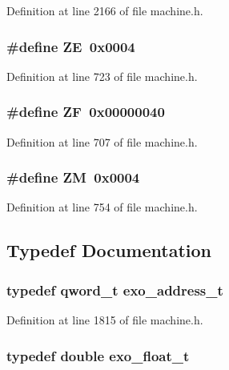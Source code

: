Definition at line 2166 of file machine.h.
\subsubsection[{ZE}]{\setlength{\rightskip}{0pt plus 5cm}\#define ZE~0x0004}\label{machine_8h_25bc8ca4e2e0de788210187701b4cbeb}




Definition at line 723 of file machine.h.
\subsubsection[{ZF}]{\setlength{\rightskip}{0pt plus 5cm}\#define ZF~0x00000040}\label{machine_8h_b4dfddb53d3b02a91b6a0429bdc10143}




Definition at line 707 of file machine.h.
\subsubsection[{ZM}]{\setlength{\rightskip}{0pt plus 5cm}\#define ZM~0x0004}\label{machine_8h_8cba89c77d3e5469a5a585e546717ebe}




Definition at line 754 of file machine.h.

\subsection{Typedef Documentation}
\subsubsection[{exo\_\-address\_\-t}]{\setlength{\rightskip}{0pt plus 5cm}typedef qword\_\-t {\bf exo\_\-address\_\-t}}\label{machine_8h_6ebeb858f9326a0ab31f2dbd07fdc797}




Definition at line 1815 of file machine.h.
\subsubsection[{exo\_\-float\_\-t}]{\setlength{\rightskip}{0pt plus 5cm}typedef double {\bf exo\_\-float\_\-t}}\label{machine_8h_1e0eec611b1473a5d69539ef6a6a1ce0}





